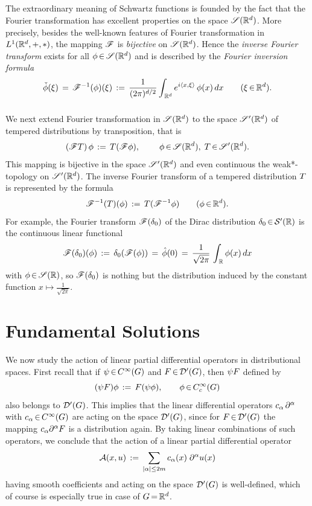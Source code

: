 \documentclass[11pt,twoside]{article}
\begin{document}
\subparagraph{}
The extraordinary meaning of Schwartz functions is founded by the fact that
the Fourier transformation has excellent properties on the space $\mathscr{S}({\mathbb{R}}^d)$.
More precisely,
besides the well-known features of Fourier transformation in $L^1({\mathbb{R}}^d,+,\ast)$,
the mapping $\mathscr{F}$ is \textit{bijective} on $\mathscr{S}({\mathbb{R}}^d)$.
Hence the \textit{inverse Fourier transform} exists for all $\phi {\,\in\,} \mathscr{S}({\mathbb{R}}^d)$
and is described by the \textit{Fourier inversion formula}
\[
\check{\phi}(\xi) \,=\, 
\mathscr{F}^{-1}(\phi)(\xi) \,:=\,
\frac{1}{(2\pi)^{d/2}}
\int_{\,{\mathbb{R}}^d} e^{i \langle x,\xi \rangle} \, \phi(x) \, dx
\quad \quad (\xi {\,\in\,} {\mathbb{R}}^d).
\]

\subparagraph{}
We next extend Fourier transformation in $\mathscr{S}({\mathbb{R}}^d)$ to the space $\mathscr{S}'({\mathbb{R}}^d)$
of tempered distributions by transposition,
that is
\[
(\mathscr{F} T) \, \phi \,:=\, T(\mathscr{F} \phi),
\quad \quad \; \phi {\,\in\,} \mathscr{S}({\mathbb{R}}^d), \; T {\,\in\,} \mathscr{S}'({\mathbb{R}}^d).
\]
This mapping is bijective in the space $\mathscr{S}'({\mathbb{R}}^d)$
and even continuous {\wrt} the weak*-topology on $\mathscr{S}'({\mathbb{R}}^d)$.
The inverse Fourier transform of a tempered distribution $T$
is represented by the formula
\[
\mathscr{F}^{-1}(T)(\phi) \,:=\, T(\mathscr{F}^{-1} \phi)
\quad \quad (\phi {\,\in\,} {\mathbb{R}}^d).
\]
For example,
the Fourier transform $\mathscr{F}(\delta_0)$ of the Dirac distribution
$\delta_0 {\,\in\,} {\mathcal{S}}'({\mathbb{R}})$ is the continuous linear functional
\[
\mathscr{F}(\delta_0)(\phi) \,:=\,
\delta_0(\mathscr{F}(\phi)) \,=\, \hat{\phi}(0) \,=\,
\frac{1}{\sqrt{2\pi}} \, \int_{\,{\mathbb{R}}} \phi(x) \, dx
\]
with $\phi \xeof \SR1$,
so $\mathscr{F}(\delta_0)$ is nothing but the distribution induced by
the constant function $x \mapsto \frac{1}{\sqrt{2\pi}}$.

\section{Fundamental Solutions}                                                %
We now study the action of linear partial differential operators 
in distributional spaces.
First recall
that if $\psi {\,\in\,} C^{\infty}(G)$ and $F {\,\in\,} {\mathcal{D}}'(G)$,
then $\psi F$ defined by
\[
(\psi F) \phi \,:=\, F (\psi \phi), \quad \quad \phi {\,\in\,} C_c^{\infty}(G)
\]
also belongs to ${\mathcal{D}}'(G)$. 
This implies that the linear differential operators $c_{\alpha} \, \partial^{\alpha}$ 
with $c_{\alpha} {\,\in\,} C^{\infty}(G)$ are acting on the space ${\mathcal{D}}'(G)$,
since for $F {\,\in\,} {\mathcal{D}}'(G)$
the mapping $c_{\alpha} \partial^{\alpha} F$ is a distribution again.
By taking linear combinations of such operators,
we conclude that the action
of a linear partial differential operator
\[
\DO(x,u) \eqdef \sum_{\abs{\alpha} \leq 2m} c_{\alpha}(x) \; \PA u(x)
\]
having smooth coefficients and acting on the space ${\mathcal{D}}'(G)$ is well-defined,
which of course is especially true in case of $G {\,=\,} {\mathbb{R}}^d$.
\end{document}
